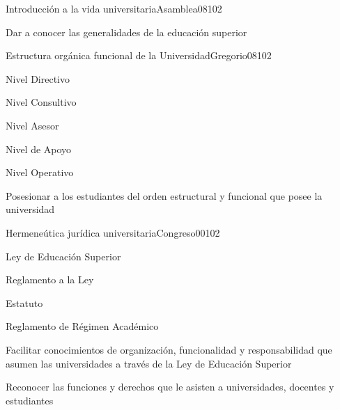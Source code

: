 \begin{syllabus}
\begin{unit}{Introducción a la vida universitaria}{Asamblea08}{10}{2}
   \begin{unitgoals}
      \item Dar a conocer las generalidades de la educación superior
   \end{unitgoals}
\end{unit}

\begin{unit}{Estructura orgánica funcional de la Universidad}{Gregorio08}{10}{2}
   \begin{topics}
        \item Nivel Directivo
	\item Nivel Consultivo
	\item Nivel Asesor
	\item Nivel de Apoyo
	\item Nivel Operativo
  \end{topics}

   \begin{unitgoals}
      \item Posesionar a los estudiantes del orden estructural y funcional que posee la universidad
   \end{unitgoals}
\end{unit}

\begin{unit}{Hermeneútica jurídica universitaria}{Congreso00}{10}{2}
   \begin{topics}
        \item Ley de Educación Superior 
	\item Reglamento a la Ley
	\item Estatuto
	\item Reglamento de Régimen Académico
   \end{topics}

   \begin{unitgoals}
      \item Facilitar conocimientos de organización, funcionalidad y responsabilidad que asumen las universidades a través de la Ley de Educación Superior
      \item Reconocer las funciones y derechos que le asisten a universidades, docentes y estudiantes
   \end{unitgoals}
\end{unit}

\begin{learning-strategies}
\FGLearningStrategies
\end{learning-strategies}

\begin{evaluation}
\FGEvaluation
\end{evaluation}


\end{syllabus}
